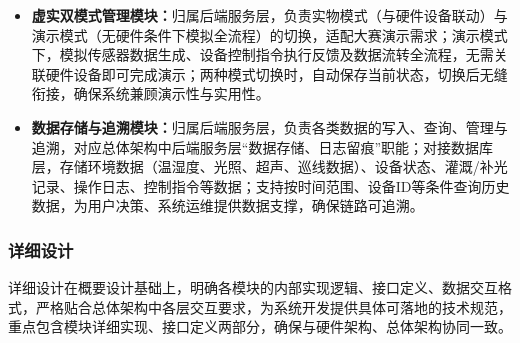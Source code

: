 \documentclass{article}
\begin{document}
\begin{enumerate}[leftmargin=2em,itemsep=0.2em,topsep=0.2em]
\begin{itemize}[leftmargin=2em,itemsep=0.2em,topsep=0.2em]
        \item \textbf{虚实双模式管理模块：}归属后端服务层，负责实物模式（与硬件设备联动）与演示模式（无硬件条件下模拟全流程）的切换，适配大赛演示需求；演示模式下，模拟传感器数据生成、设备控制指令执行反馈及数据流转全流程，无需关联硬件设备即可完成演示；两种模式切换时，自动保存当前状态，切换后无缝衔接，确保系统兼顾演示性与实用性。
    
        \item \textbf{数据存储与追溯模块：}归属后端服务层，负责各类数据的写入、查询、管理与追溯，对应总体架构中后端服务层“数据存储、日志留痕”职能；对接数据库层，存储环境数据（温湿度、光照、超声、巡线数据）、设备状态、灌溉/补光记录、操作日志、控制指令等数据；支持按时间范围、设备ID等条件查询历史数据，为用户决策、系统运维提供数据支撑，确保链路可追溯。
    
    \end{itemize}

\end{enumerate}

\subsubsection{详细设计}

详细设计在概要设计基础上，明确各模块的内部实现逻辑、接口定义、数据交互格式，严格贴合总体架构中各层交互要求，为系统开发提供具体可落地的技术规范，重点包含模块详细实现、接口定义两部分，确保与硬件架构、总体架构协同一致。
\end{document}

